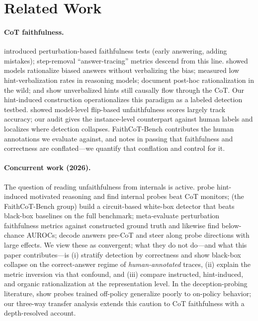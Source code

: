 \documentclass[11pt]{article}
\begin{document}
\section{Related Work}

\paragraph{CoT faithfulness.} \citet{lanham2023measuring} introduced perturbation-based faithfulness tests (early answering, adding mistakes); step-removal ``answer-tracing'' metrics descend from this line. \citet{turpin2023language} showed models rationalize biased answers without verbalizing the bias; \citet{chen2025reasoning} measured low hint-verbalization rates in reasoning models; \citet{arcuschin2025wild} document post-hoc rationalization in the wild; and \citet{zaman2026hint} show unverbalized hints still causally flow through the CoT. Our hint-induced construction operationalizes this paradigm as a labeled detection testbed. \citet{bentham2024disguised} showed model-level flip-based unfaithfulness scores largely track accuracy; our audit gives the instance-level counterpart against human labels and localizes where detection collapses. FaithCoT-Bench \citep{shen2026faithcot} contributes the human annotations we evaluate against, and notes in passing that faithfulness and correctness are conflated---we quantify that conflation and control for it.

\paragraph{Concurrent work (2026).} The question of reading unfaithfulness from internals is active. \citet{mirtaheri2026catching} probe hint-induced motivated reasoning and find internal probes beat CoT monitors; \citet{shen2026cie} (the FaithCoT-Bench group) build a circuit-based white-box detector that beats black-box baselines on the full benchmark; \citet{gurarieh2026bonafide} meta-evaluate perturbation faithfulness metrics against constructed ground truth and likewise find below-chance AUROCs; \citet{cox2026decoding} decode answers pre-CoT and steer along probe directions with large effects. We view these as convergent; what they do not do---and what this paper contributes---is (i) stratify detection by correctness and show black-box collapse on the correct-answer regime of \emph{human-annotated} traces, (ii) explain the metric inversion via that confound, and (iii) compare instructed, hint-induced, and organic rationalization at the representation level. In the deception-probing literature, \citet{offpolicy2025probes} show probes trained off-policy generalize poorly to on-policy behavior; our three-way transfer analysis extends this caution to CoT faithfulness with a depth-resolved account.
\end{document}
